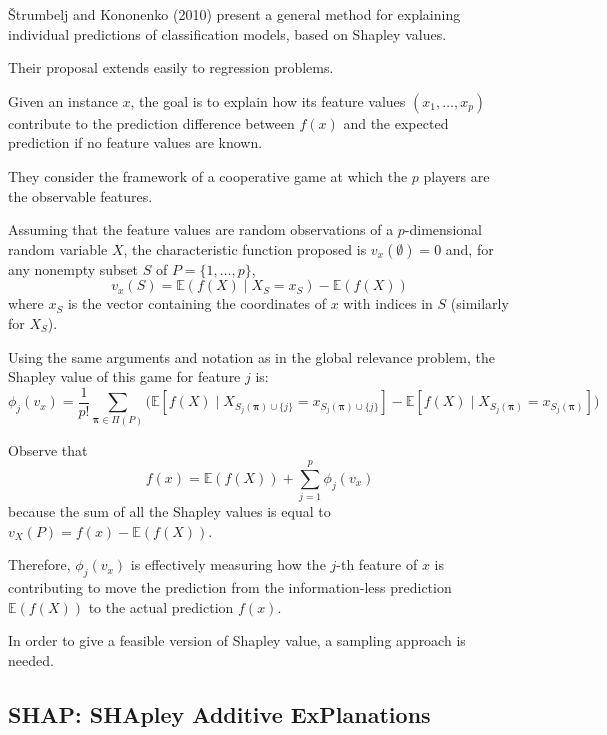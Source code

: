 Štrumbelj and Kononenko (2010) present a general method for
explaining individual predictions of classification models, based on
Shapley values.

Their proposal extends easily to regression problems.

Given an instance $x$, the goal is to explain how its feature values
$(x_1,\ldots,x_p)$ contribute to the prediction difference between $f(x)$ and
the expected prediction if no feature values are known.

They consider the framework of a
cooperative game at which the $p$ players are the observable features.

Assuming that the feature values are random observations of a
$p$-dimensional random variable $X$, the characteristic function
proposed is $v_x (\emptyset) = 0$ and, for
any nonempty subset $S$ of $P = \{1,\ldots,p\}$,
\begin{equation*}
	v_x(S) = \mathds E (f (X) \mid X_S = x_S) − \mathds E (f (X))
\end{equation*}
where $x_S$ is the vector containing the coordinates of $x$ with indices
in $S$ (similarly for $X_S$).

Using the same arguments and notation as in the global relevance
problem, the Shapley value of this game for feature $j$ is:
\begin{equation*}
	\phi_j(v_x) = \frac{1}{p!} \sum_{\boldsymbol \pi \in \Pi(P)} \biggl(
	\mathds E \left[
			f(X) \mid X_{S_j(\boldsymbol \pi) \cup \{j\}} = x_{S_j(\boldsymbol \pi) \cup \{j\}}
			\right]
	- \mathds E \left[
			f(X) \mid X_{S_j(\boldsymbol \pi)} = x_{S_j(\boldsymbol \pi)}
			\right]
    \biggr)
\end{equation*}

Observe that
\begin{equation*}
    f(x) = \mathds E(f(X)) + \sum_{j = 1}^p \phi_j(v_x)
\end{equation*}
because the sum of all the Shapley values is equal to
$v_X(P) = f(x) - \mathds E(f(X))$.

Therefore, $\phi_j(v_x)$ is effectively measuring how the $j$-th feature of $x$ is
contributing to move the prediction from the information-less prediction
$\mathds E(f(X))$ to the actual prediction $f(x)$.

In order to give a feasible version of Shapley value, a sampling approach is needed.

\subsection{SHAP: SHApley Additive ExPlanations}

